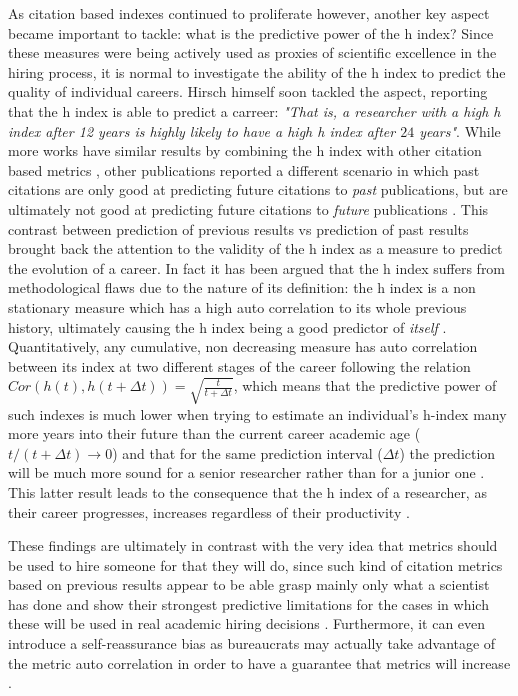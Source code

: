As citation based indexes continued to proliferate however, another key aspect became important to tackle: what is the predictive power of the h index? Since these measures
were being actively used as proxies of scientific excellence in the hiring process, it is normal to investigate the ability of the h index to predict the quality of individual
careers. Hirsch himself soon tackled the aspect, reporting that the h index is able to predict a carreer: \textit{"That is, a researcher with a high h index after 12 years is highly
likely to have a high h index after $24$ years"}\cite{Hirsch2007}.  
While more works have similar results by combining the h index with other citation based metrics \cite{Acuna2012}, other publications reported a different scenario in which
past citations are only good at predicting future citations to \textit{past} publications, but are ultimately not good at predicting future citations to \textit{future} publications \cite{Mazloumian2012}.
This contrast  between prediction of previous results vs prediction of past results brought back the attention to the
validity of the h index as a measure to predict the evolution of a career. In fact it has been argued that 
the h index suffers from methodological flaws due to the nature of its definition: the h index is a non stationary measure \cite{Penner2013b} which has a high auto correlation 
to its whole previous history, ultimately causing the h index being a good predictor of \textit{itself} \cite{Schreiber2013}. Quantitatively, any cumulative, non decreasing
measure has auto correlation between its index at two different stages of the career following the relation $Cor(h(t),h(t + \Delta t)) = \sqrt{\frac{t}{t + \Delta t}}$, which means
that the predictive power of such indexes is much lower when trying to estimate an individual's h-index many more years into their future than the current career
academic age ($t/(t + \Delta t) \rightarrow 0$) and that for the same prediction interval ($\Delta t$) the prediction will be much more sound for a senior researcher rather
than for a junior one \cite{Penner2013}. This latter result leads to the consequence that the h index of a researcher, as their career progresses, increases regardless
of their productivity \cite{Schreiber2013}. 

These findings are
 ultimately in contrast with the very idea that metrics should be used to hire someone for that they will do, since such kind of citation metrics based on previous results appear to be able
 grasp mainly only what a scientist has done and show their strongest predictive limitations for the cases in which these will be used in real academic hiring decisions \cite{Penner2013}. Furthermore,
 it can even introduce a self-reassurance bias as bureaucrats may actually take advantage of the metric auto correlation in order to have a guarantee that metrics will increase \cite{Schreiber2013}.

